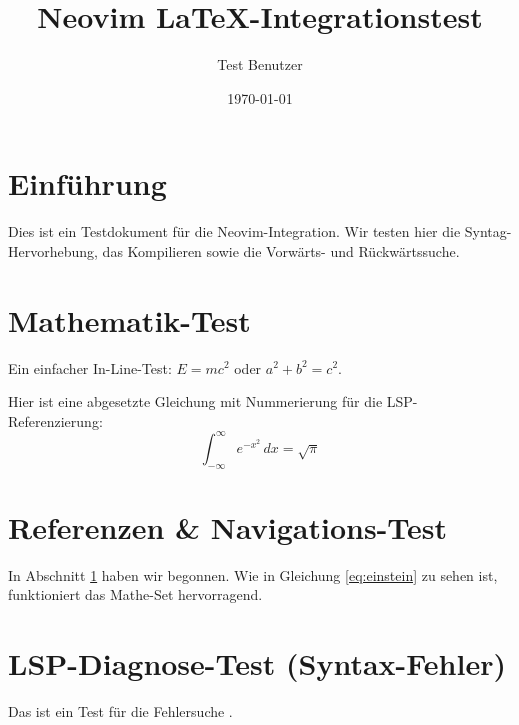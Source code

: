 \documentclass[12pt, a4paper]{article}
\title{Neovim LaTeX-Integrationstest}
\author{Test Benutzer}
\date{\today}
\begin{document}
\maketitle

\section{Einführung}
\label{sec:einfuehrung}
Dies ist ein Testdokument für die Neovim-Integration. Wir testen hier die
Syntag-Hervorhebung, das Kompilieren sowie die Vorwärts- und Rückwärtssuche.

\section{Mathematik-Test}
\label{sec:mathe}
Ein einfacher In-Line-Test: $E = mc^2$ oder $a^2 + b^2 = c^2$.

Hier ist eine abgesetzte Gleichung mit Nummerierung für die LSP-Referenzierung:
\begin{equation}
    \label{eq:einstein}
    \int_{-\infty}^{\infty} e^{-x^2} \, dx = \sqrt{\pi}
\end{equation}

\section{Referenzen \& Navigations-Test}
\label{sec:referenzen}
In Abschnitt \ref{sec:einfuehrung} haben wir begonnen. Wie in Gleichung
\ref{eq:einstein} zu sehen ist, funktioniert das Mathe-Set hervorragend.

\section{LSP-Diagnose-Test (Syntax-Fehler)}
Das ist ein Test für die Fehlersuche .
\end{document}
